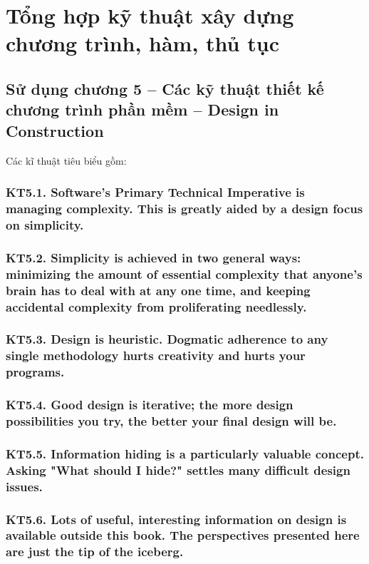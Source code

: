 \documentclass[12pt]{report}
\begin{document}
\section{\bfseries Tổng hợp kỹ thuật xây dựng chương trình, hàm, thủ tục}

\subsection{Sử dụng chương 5 -- Các kỹ thuật thiết kế chương trình phần mềm -- Design in Construction}
\noindent Các kĩ thuật tiêu biểu gồm:

\subsubsection{KT5.1. Software's Primary Technical Imperative is managing complexity. This is greatly aided by a design focus on simplicity.}

\subsubsection{KT5.2. Simplicity is achieved in two general ways: minimizing the amount of essential complexity that anyone's brain has to deal with at any one time, and keeping accidental complexity from proliferating needlessly.}

\subsubsection{KT5.3. Design is heuristic. Dogmatic adherence to any single methodology hurts creativity and hurts your programs.}

\subsubsection{KT5.4. Good design is iterative; the more design possibilities you try, the better your final design will be.}

\subsubsection{KT5.5. Information hiding is a particularly valuable concept. Asking "What should I hide?" settles many difficult design issues.}

\subsubsection{KT5.6. Lots of useful, interesting information on design is available outside this book. The perspectives presented here are just the tip of the iceberg.}
\end{document}
